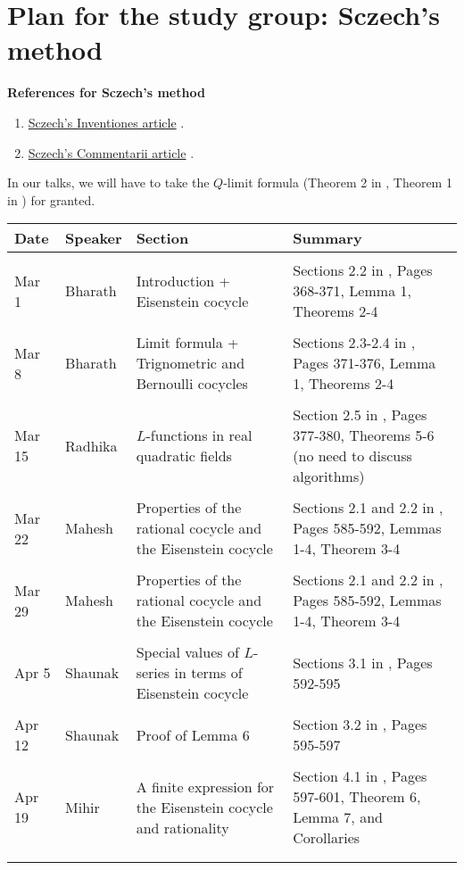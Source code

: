 \documentclass[11pt,a4paper,notitlepage]{article}
\begin{document}
\section{Plan for the study group: Sczech's method}	
	\textbf{References for Sczech's method}
\begin{enumerate}
\item \href{sczech-eisenstein.pdf}{Sczech's Inventiones  article}	 \cite{MR1231838}.
\item \href{sczech_real_quadratic_fields.pdf}{Sczech's Commentarii  article} \cite{MR1171300}.
\end{enumerate}
In our talks, we will have to take the $Q$-limit formula (Theorem 2 in \cite{MR1231838}, Theorem 1 in \cite{MR1171300}) for granted.
\begin{center}
\begin{tabularx}{\textwidth}{p{6cm}p{5cm}p{5cm}p{5cm}}
\toprule  
Date & Speaker & Section  & Summary  \\ 
\midrule \\
Mar 1 & Bharath & Introduction + Eisenstein cocycle  & Sections 2.2 in \cite{MR1171300}, Pages 368-371, Lemma 1, Theorems 2-4\\ \\
Mar 8 & Bharath &  Limit formula + Trignometric and Bernoulli cocycles  & Sections 2.3-2.4 in \cite{MR1171300}, Pages 371-376, Lemma 1, Theorems 2-4  \\ \\
Mar 15 & Radhika &  $L$-functions in real quadratic fields & Section 2.5 in \cite{MR1171300}, Pages 377-380, Theorems 5-6 (no need to discuss algorithms)\\ \\ 
 Mar 22  & Mahesh & 	Properties of the rational cocycle and the Eisenstein cocycle & Sections 2.1 and 2.2 in \cite{MR1231838}, Pages 585-592, Lemmas 1-4, Theorem 3-4 \\ \\
  Mar 29  & Mahesh & 	Properties of the rational cocycle and the Eisenstein cocycle & Sections 2.1 and 2.2 in \cite{MR1231838}, Pages 585-592, Lemmas 1-4, Theorem 3-4 \\ \\
Apr 5  & Shaunak & 	Special values of $L$-series in terms of Eisenstein cocycle & Sections 3.1 in \cite{MR1231838}, Pages 592-595  \\ \\
Apr 12  & Shaunak &  Proof of Lemma 6 &  Section 3.2 in \cite{MR1231838}, Pages 595-597 \\ \\
Apr 19  & Mihir &  A finite expression for the Eisenstein cocycle and rationality &  Section 4.1 in \cite{MR1231838}, Pages 597-601, Theorem 6, Lemma 7, and Corollaries \\ \\
\bottomrule \\
\end{tabularx}
\end{center}
\end{document}
